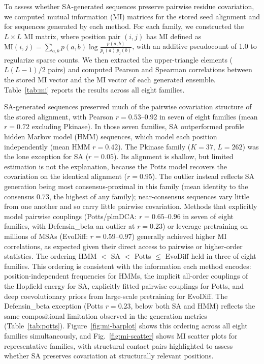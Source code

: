 To assess whether SA-generated sequences preserve pairwise residue covariation, we computed mutual information (MI) matrices for the stored seed alignment and for sequences generated by each method. For each family, we constructed the $L \times L$ MI matrix, where position pair $(i, j)$ has MI defined as $\mathrm{MI}(i,j) = \sum_{a,b} p(a,b) \log\frac{p(a,b)}{p_i(a)\, p_j(b)}$, with an additive pseudocount of 1.0 to regularize sparse counts. We then extracted the upper-triangle elements ($L(L{-}1)/2$ pairs) and computed Pearson and Spearman correlations between the stored MI vector and the MI vector of each generated ensemble. Table~\ref{tab:mi} reports the results across all eight families.

SA-generated sequences preserved much of the pairwise covariation structure of the stored alignment, with Pearson $r{=}0.53$--$0.92$ in seven of eight families (mean $r{=}0.72$ excluding Pkinase). In those seven families, SA outperformed profile hidden Markov model (HMM) sequences, which model each position independently (mean HMM $r{=}0.42$). The Pkinase family ($K{=}37$, $L{=}262$) was the lone exception for SA ($r{=}0.05$). Its alignment is shallow, but limited estimation is not the explanation, because the Potts model recovers the covariation on the identical alignment ($r{=}0.95$). The outlier instead reflects SA generation being most consensus-proximal in this family (mean identity to the consensus $0.73$, the highest of any family); near-consensus sequences vary little from one another and so carry little pairwise covariation. Methods that explicitly model pairwise couplings (Potts/plmDCA: $r{=}0.65$--$0.96$ in seven of eight families, with Defensin\_beta an outlier at $r{=}0.23$) or leverage pretraining on millions of MSAs (EvoDiff: $r{=}0.59$--$0.97$) generally achieved higher MI correlations, as expected given their direct access to pairwise or higher-order statistics. The ordering HMM $<$ SA $<$ Potts $\leq$ EvoDiff held in three of eight families. This ordering is consistent with the information each method encodes: position-independent frequencies for HMMs, the implicit all-order couplings of the Hopfield energy for SA, explicitly fitted pairwise couplings for Potts, and deep coevolutionary priors from large-scale pretraining for EvoDiff. The Defensin\_beta exception (Potts $r{=}0.23$, below both SA and HMM) reflects the same compositional limitation observed in the generation metrics (Table~\ref{tab:potts}). Figure~\ref{fig:mi-barplot} shows this ordering across all eight families simultaneously, and Fig.~\ref{fig:mi-scatter} shows MI scatter plots for representative families, with structural contact pairs highlighted to assess whether SA preserves covariation at structurally relevant positions.

